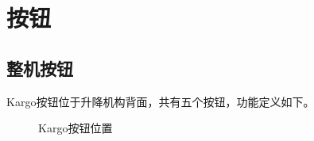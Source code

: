 \documentclass[a4paper,11pt,english,openany,oneside]{sphinxmanual}
\begin{document}
\section{按钮}
\label{\detokenize{07 _u6280_u672f_u89c4_u683c:id22}}\label{\detokenize{07 _u6280_u672f_u89c4_u683c:id23}}

\subsection{整机按钮}
\label{\detokenize{07 _u6280_u672f_u89c4_u683c:id24}}\label{\detokenize{07 _u6280_u672f_u89c4_u683c:id25}}
\sphinxAtStartPar
Kargo按钮位于升降机构背面，共有五个按钮，功能定义如下。

\begin{figure}[H]
\centering
\capstart

\noindent{}
\caption{Kargo按钮位置}\label{\detokenize{07 _u6280_u672f_u89c4_u683c:id68}}\end{figure}
\end{document}
